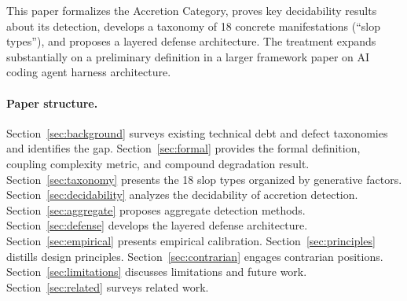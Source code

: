 \documentclass[11pt, a4paper, logo, copyright]{googledeepmind}
\begin{document}
This paper formalizes the Accretion Category, proves key decidability results about its detection, develops a taxonomy of 18 concrete manifestations (``slop types''), and proposes a layered defense architecture. The treatment expands substantially on a preliminary definition in a larger framework paper on AI coding agent harness architecture.

\paragraph{Paper structure.} Section~\ref{sec:background} surveys existing technical debt and defect taxonomies and identifies the gap. Section~\ref{sec:formal} provides the formal definition, coupling complexity metric, and compound degradation result. Section~\ref{sec:taxonomy} presents the 18 slop types organized by generative factors. Section~\ref{sec:decidability} analyzes the decidability of accretion detection. Section~\ref{sec:aggregate} proposes aggregate detection methods. Section~\ref{sec:defense} develops the layered defense architecture. Section~\ref{sec:empirical} presents empirical calibration. Section~\ref{sec:principles} distills design principles. Section~\ref{sec:contrarian} engages contrarian positions. Section~\ref{sec:limitations} discusses limitations and future work. Section~\ref{sec:related} surveys related work.
\end{document}
